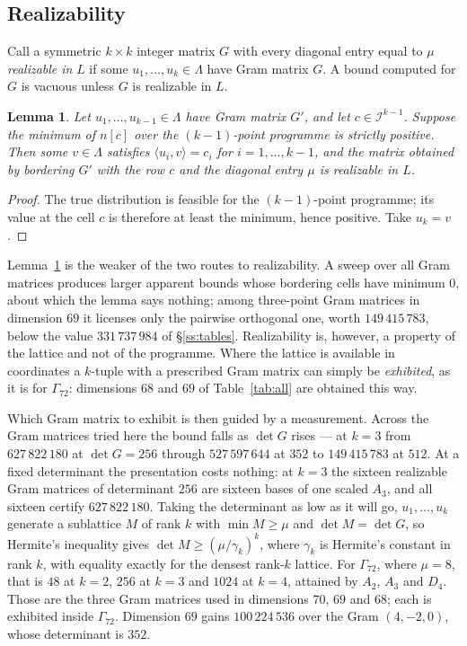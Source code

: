 \documentclass[11pt]{amsart}
\newtheorem{lemma}[theorem]{Lemma}
\theoremstyle{remark}
\newcommand{\Gsz}{\Gamma_{72}}
\newcommand{\ip}[2]{\langle #1,#2\rangle}
\begin{document}
\subsection{Realizability}\label{ss:realize}

Call a symmetric $k\times k$ integer matrix $G$ with every diagonal entry equal
to $\mu$ \emph{realizable in} $L$ if some $u_1,\dots,u_k\in\Lambda$ have Gram
matrix $G$. A bound computed for $G$ is vacuous unless $G$ is realizable in $L$.

\begin{lemma}\label{lem:realize}
Let $u_1,\dots,u_{k-1}\in\Lambda$ have Gram matrix $G'$, and let
$c\in\mathcal I^{k-1}$.
Suppose the minimum of $n[c]$ over the $(k-1)$-point programme is strictly
positive. Then some $v\in\Lambda$ satisfies $\ip{u_i}{v}=c_i$ for
$i=1,\dots,k-1$, and the matrix obtained by bordering $G'$ with the row $c$ and
the diagonal entry $\mu$ is realizable in $L$.
\end{lemma}

\begin{proof}
The true distribution is feasible for the $(k-1)$-point programme; its value
at the cell $c$ is therefore at least the minimum, hence positive. Take $u_k=v$.
\end{proof}

Lemma~\ref{lem:realize} is the weaker of the two routes to realizability. A sweep
over all Gram matrices produces larger apparent bounds whose bordering cells have
minimum $0$, about which the lemma says nothing; among three-point Gram matrices
in dimension $69$ it licenses only the pairwise orthogonal one, worth
$149\,415\,783$, below the value $331\,737\,984$ of \S\ref{ss:tables}.
Realizability is, however, a property of the lattice and not of the programme.
Where the lattice is available in coordinates a $k$-tuple with a prescribed Gram
matrix can simply be \emph{exhibited}, as it is for $\Gsz$: dimensions $68$ and
$69$ of Table~\ref{tab:all} are obtained this way.

Which Gram matrix to exhibit is then guided by a measurement. Across the
Gram matrices tried here the bound falls as $\det G$ rises --- at $k=3$ from
$627\,822\,180$ at $\det G=256$ through $527\,597\,644$ at $352$ to
$149\,415\,783$ at $512$. At a fixed determinant the
presentation costs nothing: at $k=3$ the sixteen realizable Gram matrices of determinant
$256$ are sixteen bases of one scaled $A_3$, and all sixteen certify $627\,822\,180$. Taking the
determinant as low as it will go, $u_1,\dots,u_k$ generate a sublattice $M$ of rank $k$ with
$\min M\ge\mu$ and $\det M=\det G$, so Hermite's inequality gives
$\det M\ge(\mu/\gamma_k)^k$, where $\gamma_k$ is Hermite's constant in rank $k$,
with equality exactly for the densest rank-$k$ lattice. For $\Gsz$, where
$\mu=8$, that is $48$ at $k=2$, $256$ at $k=3$ and $1024$ at $k=4$, attained by
$A_2$, $A_3$ and $D_4$. Those are the three Gram matrices used in dimensions
$70$, $69$ and $68$; each is exhibited inside $\Gsz$. Dimension $69$ gains $100\,224\,536$ over
the Gram $(4,-2,0)$, whose determinant is $352$.
\end{document}
